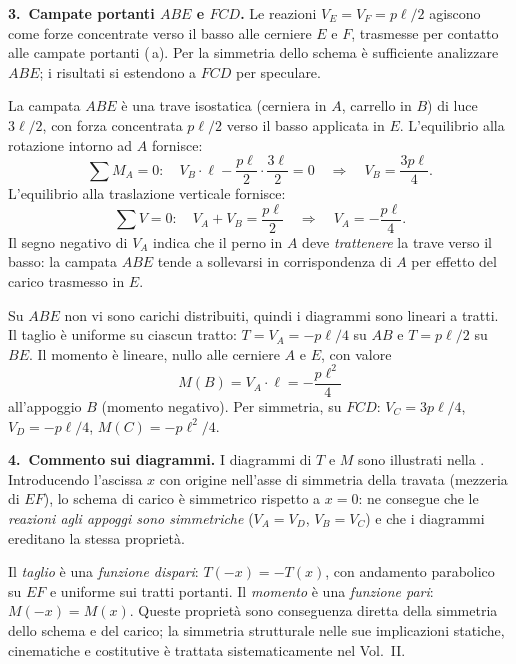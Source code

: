 


\medskip
\noindent\textbf{3.~Campate portanti $ABE$ e $FCD$.}
Le reazioni $V_E = V_F = p\ell/2$ agiscono come forze concentrate
verso il basso alle cerniere $E$ e $F$, trasmesse per contatto
alle campate portanti (\,a). Per la simmetria dello schema è sufficiente
analizzare $ABE$; i risultati si estendono a $FCD$ per speculare.

La campata $ABE$ è una trave isostatica (cerniera in $A$, carrello
in $B$) di luce $3\ell/2$, con forza concentrata $p\ell/2$ verso il
basso applicata in $E$. L'equilibrio alla rotazione intorno ad $A$ fornisce:
\[
\sum M_A = 0\colon \quad
V_B \cdot \ell - \frac{p\ell}{2} \cdot \frac{3\ell}{2} = 0
\quad\Longrightarrow\quad
V_B = \frac{3p\ell}{4}.
\]
L'equilibrio alla traslazione verticale fornisce:
\[
\sum V = 0\colon \quad
V_A + V_B = \frac{p\ell}{2}
\quad\Longrightarrow\quad
V_A = -\frac{p\ell}{4}.
\]
Il segno negativo di $V_A$ indica che il perno in $A$ deve
\emph{trattenere} la trave verso il basso: la campata $ABE$ tende
a sollevarsi in corrispondenza di $A$ per effetto del carico
trasmesso in $E$.

Su $ABE$ non vi sono carichi distribuiti, quindi i diagrammi sono
lineari a tratti. Il taglio è uniforme su ciascun tratto:
$T = V_A = -p\ell/4$ su $AB$ e $T = p\ell/2$ su $BE$.
Il momento è lineare, nullo alle cerniere $A$ e $E$, con valore
\[
M(B) = V_A \cdot \ell = -\frac{p\ell^2}{4}
\]
all'appoggio $B$ (momento negativo).
Per simmetria, su $FCD$: $V_C = 3p\ell/4$, $V_D = -p\ell/4$,
$M(C) = -p\ell^2/4$.

\medskip
\noindent\textbf{4.~Commento sui diagrammi.}
I diagrammi di $T$ e $M$ sono illustrati nella
.
Introducendo l'ascissa $x$ con origine nell'asse di simmetria
della travata (mezzeria di $EF$), lo schema di carico è
simmetrico rispetto a $x = 0$: ne consegue che le
\emph{reazioni agli appoggi sono simmetriche}
($V_A = V_D$, $V_B = V_C$) e che i diagrammi ereditano
la stessa proprietà.

Il \emph{taglio} è una \emph{funzione dispari}:
$T(-x) = -T(x)$, con andamento parabolico su $EF$
e uniforme sui tratti portanti.
Il \emph{momento} è una \emph{funzione pari}:
$M(-x) = M(x)$.
Queste proprietà sono conseguenza diretta della simmetria
dello schema e del carico; la simmetria strutturale nelle
sue implicazioni statiche, cinematiche e costitutive è
trattata sistematicamente nel Vol.~II.

